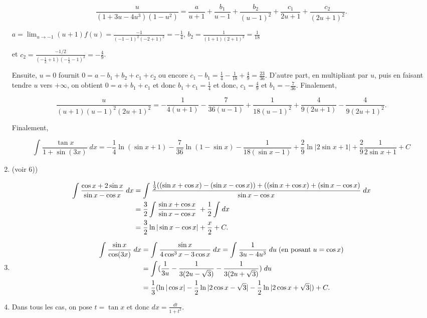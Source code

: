 \documentclass[11pt,a4paper]{article}
\begin{document}
\begin{enumerate}
$$\frac{u}{(1+3u-4u^3)(1-u^2)}=\frac{a}{u+1}+\frac{b_1}{u-1}+\frac{b_2}{(u-1)^2}+\frac{c_1}{2u+1}+\frac{c_2}{(2u+1)^2}.$$

$a=\lim_{u\rightarrow -1}(u+1)f(u)=\frac{-1}{(-1-1)^2(-2+1)^2}=-\frac{1}{4}$, $b_2=\frac{1}{(1+1)(2+1)^2}=\frac{1}{18}$

et $c_2=\frac{-1/2}{(-\frac{1}{2}+1)(-\frac{1}{2}-1)^2}=-\frac{4}{9}$.

Ensuite, $u=0$ fournit $0=a-b_1+b_2+c_1+c_2$ ou encore $c_1-b_1=\frac{1}{4}-\frac{1}{18}+\frac{4}{9}=\frac{23}{36}$. D'autre part, en multipliant par $u$, puis en faisant tendre $u$ vers $+\infty$, on obtient $0=a+b_1+c_1$ et donc $b_1+c_1=\frac{1}{4}$ et donc, $c_1=\frac{4}{9}$ et $b_1=-\frac{7}{36}$. Finalement,

$$\frac{u}{(u+1)(u-1)^2(2u+1)^2}=-\frac{1}{4(u+1)}-\frac{7}{36(u-1)}+\frac{1}{18(u-1)^2}+\frac{4}{9(2u+1)}-\frac{4}{9(2u+1)^2}.$$

Finalement,

$$\int_{}^{}\frac{\tan x}{1+\sin(3x)}\;dx=-\frac{1}{4}\ln(\sin x+1)-\frac{7}{36}\ln(1-\sin x)-\frac{1}{18(\sin x-1)}+\frac{2}{9}\ln|2\sin x+1|+\frac{2}{9}\frac{1}{2\sin x+1}+C$$

\item  (voir 6)) 

\begin{align*}\ensuremath
\int_{}^{}\frac{\cos x+2\sin x}{\sin x-\cos x}\;dx&=\int_{}^{}\frac{\frac{1}{2}((\sin x+\cos x)-(\sin x-\cos x))+((\sin x+\cos x)+(\sin x-\cos x)}{\sin x-\cos x}\;dx\\
 &=\frac{3}{2}\int_{}^{}\frac{\sin x+\cos x}{\sin x-\cos x}\;+\frac{1}{2}\int_{}^{}dx\\
 &=\frac{3}{2}\ln|\sin x-\cos x|+\frac{x}{2}+C.
\end{align*}

\item 

\begin{align*}\ensuremath
\int_{}^{}\frac{\sin x}{\cos(3x)}\;dx&=\int_{}^{}\frac{\sin x}{4\cos^3x-3\cos x}\;dx
=\int_{}^{}\frac{1}{3u-4u^3}\;du\;(\mbox{en posant}\;u=\cos x)\\
 &=\int_{}^{}(\frac{1}{3u}-\frac{1}{3(2u-\sqrt{3})}-\frac{1}{3(2u+\sqrt{3})})\;du\\
 &=\frac{1}{3}(\ln|\cos x|-\frac{1}{2}\ln|2\cos x-\sqrt{3}|-\frac{1}{2}\ln|2\cos x+\sqrt{3}|)+C.
\end{align*}
\item  Dans tous les cas, on pose $t=\tan x$ et donc $dx=\frac{dt}{1+t^2}$.


\end{enumerate}
\end{document}
